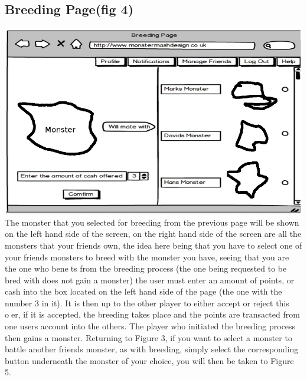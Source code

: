\documentclass{project}
\begin{document}
\subsection{Breeding Page(fig 4)}
\includegraphics[scale=0.5]{breedingPage.jpg}\\
The monster that you selected for breeding from the previous page will be shown
on the left hand side of the screen, on the right hand side of the screen are all the
monsters that your friends own, the idea here being that you have to select one of
your friends monsters to breed with the monster you have, seeing that you are the
one who benets from the breeding process (the one being requested to be bred with
does not gain a monster) the user must enter an amount of points, or cash into the
box located on the left hand side of the page (the one with the number 3 in it). It
is then up to the other player to either accept or reject this oer, if it is accepted,
the breeding takes place and the points are transacted from one users account into
the others. The player who initiated the breeding process then gains a monster.
Returning to Figure 3, if you want to select a monster to battle another friends
monster, as with breeding, simply select the corresponding button underneath the
monster of your choice, you will then be taken to Figure 5.
\end{document}
